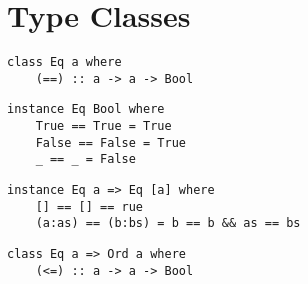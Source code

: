 \section{Type Classes}

\begin{verbatim}
class Eq a where
    (==) :: a -> a -> Bool
\end{verbatim}

\begin{verbatim}
instance Eq Bool where
    True == True = True
    False == False = True
    _ == _ = False
\end{verbatim}

\begin{verbatim}
instance Eq a => Eq [a] where
    [] == [] == rue
    (a:as) == (b:bs) = b == b && as == bs
\end{verbatim}

\begin{verbatim}
class Eq a => Ord a where
    (<=) :: a -> a -> Bool
\end{verbatim}
